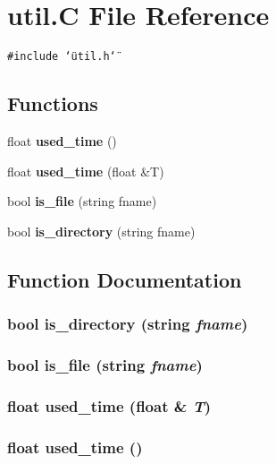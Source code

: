 \section{util.C File Reference}
\label{util_8C}
{\tt \#include \char`\"{}util.h\char`\"{}}\par
\subsection*{Functions}
\begin{CompactItemize}
\item 
float {\bf used\_\-time} ()
\item 
float {\bf used\_\-time} (float \&T)
\item 
bool {\bf is\_\-file} (string fname)
\item 
bool {\bf is\_\-directory} (string fname)
\end{CompactItemize}


\subsection{Function Documentation}
\subsubsection{\setlength{\rightskip}{0pt plus 5cm}bool is\_\-directory (string {\em fname})}\label{util_8C_a3}


\subsubsection{\setlength{\rightskip}{0pt plus 5cm}bool is\_\-file (string {\em fname})}\label{util_8C_a2}


\subsubsection{\setlength{\rightskip}{0pt plus 5cm}float used\_\-time (float \& {\em T})}\label{util_8C_a1}


\subsubsection{\setlength{\rightskip}{0pt plus 5cm}float used\_\-time ()}\label{util_8C_a0}


